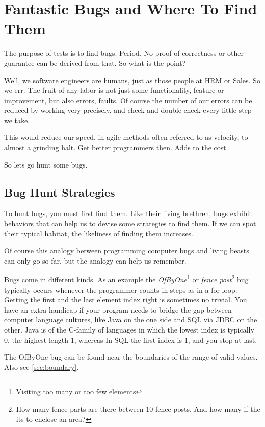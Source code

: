 \documentclass[\docroot/main]{subfiles}
\begin{document}
\chapter{Fantastic Bugs and Where To Find Them}

The purpose of tests is to find bugs. Period. No proof of correctness
or other guarantee can be derived from that. So what is the point?

Well, we software engineers are humans, just as those people at HRM or
Sales. So we err. The fruit of any labor is not just some
functionality, feature or improvement, but also errors, faults. Of
course the number of our errors can be reduced by working very
precisely, and check and double check every little step we take.

This would reduce our speed, in agile methods often referred to as
velocity, to almost a grinding halt. Get better programmers then. Adds
to the cost.

So lets go hunt some bugs.

\section{Bug Hunt Strategies}
To hunt bugs, you must first find them. Like their living brethren,
bugs exhibit behaviors that can help us to devise some strategies to
find them. If we can spot their typical habitat, the likeliness of
finding them increases. 

Of course this analogy between programming computer bugs and living
beasts can only go so far, but the analogy can help us remember.

Bugs come in different kinds. As an example the
\textit{OfByOne}\footnote{Visiting too many or too few elements} or
\textit{fence post}\footnote{How many fence parts are there between 10
fence posts. And how many if the its to enclose an area?} bug typically occurs whenever the programmer
counts in steps as in a 
for loop. Getting the first and the last element index right is
sometimes no trivial. You have an extra handicap if your program needs
to bridge the gap between computer language cultures, like Java on the
one side and \textsf{SQL} via \textsf{JDBC} on the other. Java is of the C-family of languages in
which the lowest index is typically 0, the highest length-1, whereas  In SQL
the first index is 1, and you stop at last.

The OfByOne bug can be found near the boundaries of the range of valid
values. Also see \ref{sec:boundary}.
\end{document}

